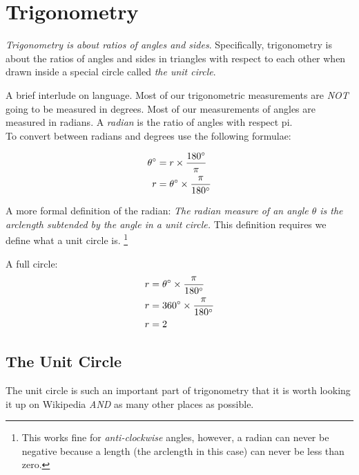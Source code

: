 \chapter{Trigonometry}
\label{chap:Trigonometry}
\emph{Trigonometry is about ratios of angles and sides}.
Specifically, trigonometry is about the ratios of angles and sides in triangles
with respect to each other when drawn inside a special circle called \emph{the
unit circle}.

A brief interlude on language. Most of our trigonometric measurements are
\emph{NOT} going to be measured in degrees. Most of our measurements of angles
are measured in radians. A \emph{radian} is the ratio of angles with respect
pi.\\
To convert between radians and degrees use the following formulae:

\begin{align}
  \theta ^\circ & = r \times \frac{180^\circ}{\pi} \\
            r & = \theta ^\circ \times \frac{\pi}{180^\circ}
\end{align}

A more formal definition of the radian: \emph{The radian measure of an angle
$\theta$ is the arclength subtended by the angle in a unit circle.} This
definition requires we define what a unit circle is. \footnote{This works fine
for \emph{anti-clockwise} angles, however, a radian can never be negative
because a length (the arclength in this case) can never be less than zero.}

A full circle:
\begin{align}
  r & = \theta ^\circ \times \frac{\pi}{180^\circ} \\
  r & = 360 ^\circ \times \frac{\pi}{180^\circ} \\
  r & = 2 
\end{align}

\newpage
\section{The Unit Circle}
\label{sec:TheUnitCircle}
The unit circle is such an important part of trigonometry that it is worth
looking it up on Wikipedia \emph{AND} as many other places as possible.


